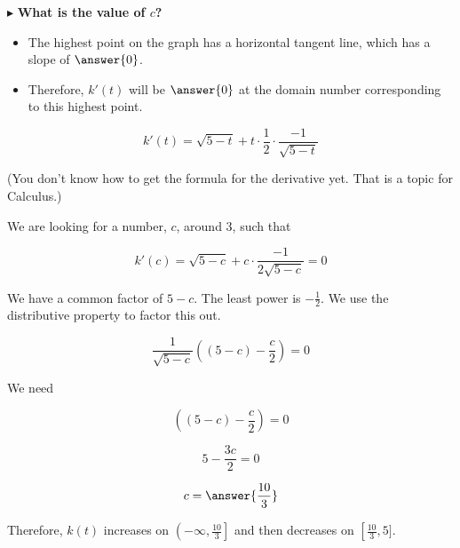 \documentclass{ximera}
\begin{document}
$\blacktriangleright$ \textbf{\textcolor{blue!55!black}{What is the value of $c$?}} \\

\begin{explanation}


\begin{itemize}
\item The highest point on the graph has a horizontal tangent line, which has a slope of $\answer{0}$.  
\item Therefore, $k'(t)$ will be $\answer{0}$ at the domain number corresponding to this highest point.
\end{itemize}




\[   k'(t) = \sqrt{5-t} + t \cdot \frac{1}{2} \cdot \frac{-1}{\sqrt{5-t}}    \]

(You don't know how to get the formula for the derivative yet.  That is a topic for Calculus.)

We are looking for a number, $c$, around $3$, such that 


\[   k'(c) = \sqrt{5-c} + c \cdot \frac{-1}{2 \sqrt{5-c}}  = 0  \]

We have a common factor of $5-c$.  The least power is $-\frac{1}{2}$.  We use the distributive property to factor this out.


\[  \frac{1}{\sqrt{5-c}} \left( (5-c) - \frac{c}{2} \right) = 0  \]




We need 


\[  \left( (5-c) - \frac{c}{2} \right) = 0  \]

\[  5 - \frac{3c}{2}  = 0  \]


\[  c = \answer{\frac{10}{3}}  \]


\end{explanation}


Therefore, $k(t)$ increases on $\left(-\infty, \frac{10}{3}\right]$ and then decreases on $\left[\frac{10}{3},5]$.
\end{document}
